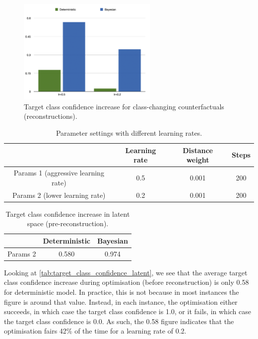 \documentclass{article}
\begin{document}
\begin{figure}[H]
    \centering
    \includegraphics[width=0.6\textwidth]{figures/Class/ConfidenceIncrease.png}
    \caption{Target class confidence increase for class-changing counterfactuals (reconstructions).}
    \label{fig:cc_confidence_increase}
\end{figure}

\begin{table}[H]
    \centering
    \begin{tabular}{|c|c|c|c|}
        \hline
        & Learning rate & Distance weight & Steps \\
        \hline
        Params 1 (aggressive learning rate) & 0.5 & 0.001 & 200 \\
        \hline
        Params 2 (lower learning rate) & 0.2 & 0.001 & 200 \\
        \hline
    \end{tabular}
    \caption{Parameter settings with different learning rates.}
    \label{tab:parameter_settings}
\end{table}

\begin{table}[H]
    \centering
    \begin{tabular}{|c|c|c|}
        \hline
        & Deterministic & Bayesian \\
        \hline
        Params 2 & 0.580 & 0.974 \\
        \hline
    \end{tabular}
    \caption{Target class confidence increase in latent space (pre-reconstruction).}
    \label{tab:target_class_confidence_latent}
\end{table}

Looking at \autoref{tab:target_class_confidence_latent}, we see that the average target class confidence increase during optimisation (before reconstruction) is only 0.58 for deterministic model. In practice, this is not because in most instances the figure is around that value. Instead, in each instance, the optimisation either succeeds, in which case the target class confidence is 1.0, or it fails, in which case the target class confidence is 0.0. As such, the 0.58 figure indicates that the optimisation fairs 42\% of the time for a learning rate of 0.2. 
\end{document}
